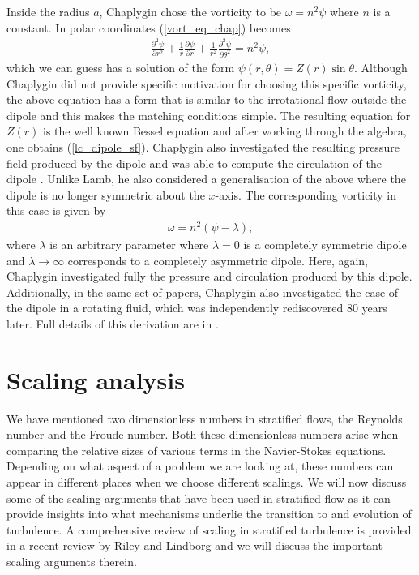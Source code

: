 Inside the radius $a$, Chaplygin chose the vorticity to be $\omega = n^{2}\psi$ where $n$ is a constant. In polar coordinates (\ref{vort_eq_chap}) becomes 
\begin{align}
\frac{\partial^{2}\psi}{\partial r^{2}} + \frac{1}{r}\frac{\partial \psi}{\partial r} + \frac{1}{r^{2}}\frac{\partial^{2}\psi}{\partial \theta^{2}} =  n^{2}\psi,
\end{align}
which we can guess has a solution of the form $\psi(r,\theta) = Z(r)\sin\theta$. Although Chaplygin did not provide specific motivation for choosing this specific vorticity, the above equation has a form that is similar to the irrotational flow outside the dipole and this makes the matching conditions simple. The resulting equation for $Z(r)$ is the well known Bessel equation \cite{meleshko1994} and after working through the algebra, one obtains (\ref{lc_dipole_sf}). Chaplygin also investigated the resulting pressure field produced by the dipole and was able to compute the circulation of the dipole \cite{meleshko1994}. Unlike Lamb, he also considered a generalisation of the above where the dipole is no longer symmetric about the $x$-axis. The corresponding vorticity in this case is given by
\begin{align}
\omega = n^{2}(\psi - \lambda),
\end{align}
where $\lambda$ is an arbitrary parameter where $\lambda=0$ is a completely symmetric dipole and $\lambda\rightarrow\infty$ corresponds to a completely asymmetric dipole. Here, again, Chaplygin investigated fully the pressure and circulation produced by this dipole. Additionally, in the same set of papers, Chaplygin also investigated the case of the dipole in a rotating fluid, which was independently rediscovered 80 years later. Full details of this derivation are in \cite{meleshko1994}.


\section{Scaling analysis}
We have mentioned two dimensionless numbers in stratified flows, the Reynolds number and the Froude number. Both these dimensionless numbers arise when comparing the relative sizes of various terms in the Navier-Stokes equations. Depending on what aspect of a problem we are looking at, these numbers can appear in different places when we choose different scalings. We will now discuss some of the scaling arguments that have been used in stratified flow as it can provide insights into what mechanisms underlie the transition to and evolution of turbulence. A comprehensive review of scaling in stratified turbulence is provided in a recent review by Riley and Lindborg \cite{rileylindborg2013} and we will discuss the important scaling arguments therein. 

